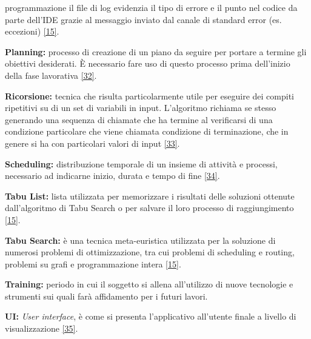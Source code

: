 \begin{description}
    programmazione il file di log evidenzia il tipo di errore e il punto nel codice
    da parte dell’IDE grazie al messaggio inviato dal canale di standard error (es.
    eccezioni) \hyperref[slide]{[15]}.
    \item \label{Planning} \textbf{Planning:} processo di creazione di un piano da seguire per portare a termine gli obiettivi desiderati. È necessario fare uso di questo processo prima 
    dell'inizio della fase lavorativa \hyperref[planning]{[32]}.
    \item \label{Ricorsione} \textbf{Ricorsione:} tecnica che risulta particolarmente utile per eseguire dei compiti ripetitivi su di un set di variabili in input.
    L'algoritmo richiama se stesso generando una sequenza di chiamate che ha termine al verificarsi di una condizione particolare che viene chiamata condizione di terminazione, che in genere si ha con particolari
    valori di input \hyperref[ricorsione]{[33]}.
    \item \label{Scheduling} \textbf{Scheduling:} distribuzione temporale di un insieme di attività e processi, necessario ad indicarne inizio, durata e tempo di fine \hyperref[scheduling2]{[34]}. 
    \item \label{Tabu List} \textbf{Tabu List:} lista utilizzata per memorizzare i risultati delle soluzioni ottenute dall'algoritmo di Tabu Search o per salvare il loro processo di raggiungimento \hyperref[slide]{[15]}.
    \item \label{Tabu Search} \textbf{Tabu Search:} è una tecnica meta-euristica utilizzata per la soluzione di numerosi problemi di ottimizzazione, tra cui problemi di scheduling e routing, 
    problemi su grafi e programmazione intera \hyperref[slide]{[15]}.
    \item \label{Training} \textbf{Training:} periodo in cui il soggetto si allena all'utilizzo di nuove tecnologie e strumenti sui quali farà affidamento per i futuri lavori.
    \item \label{UI} \textbf{UI:} \textit{User interface}, è come si presenta l'applicativo all'utente finale a livello di visualizzazione \hyperref[UI]{[35]}. 
    
\end{description}
